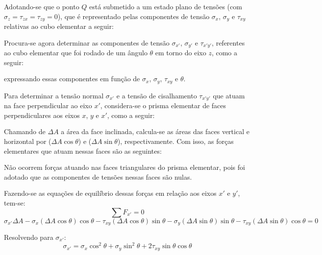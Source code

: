 Adotando-se que o ponto $Q$ está submetido a um estado plano de tensões (com $\sigma_z=\tau_{zx}=\tau_{zy}=0$), que é representado pelas componentes de tensão $\sigma_x$, $\sigma_y$ e $\tau_{xy}$ relativas ao cubo elementar a seguir:

Procura-se agora determinar as componentes de tensão $\sigma_{x'}$, $\sigma_{y'}$ e $\tau_{x'y'}$, referentes ao cubo elementar que foi rodado de um ângulo $\theta$ em torno do eixo $z$, como a seguir:

expressando essas componentes em função de $\sigma_x$, $\sigma_y$, $\tau_{xy}$ e $\theta$.

Para determinar a tensão normal $\sigma_{x'}$ e a tensão de cisalhamento $\tau_{x'y'}$ que atuam na face perpendicular ao eixo $x'$, considera-se o prisma elementar de faces perpendiculares aos eixos $x$, $y$ e $x'$, como a seguir:

Chamando de $\Delta A$ a área da face inclinada, calcula-se as áreas das faces vertical e horizontal por ($\Delta A\cos\theta$) e ($\Delta A\sin\theta$), respectivamente. Com isso, as forças elementares que atuam nessas faces são as seguintes:

Não ocorrem forças atuando nas faces triangulares do prisma elementar, pois foi adotado que as componentes de tensões nessas faces são nulas.

Fazendo-se as equações de equilíbrio dessas forças em relação aos eixos $x'$ e $y'$, tem-se:
$$\sum F_{x'}=0$$
$$\sigma_{x'}\Delta A-\sigma_x(\Delta A\cos\theta)\cos\theta-\tau_{xy}(\Delta A\cos\theta)\sin\theta-\sigma_y(\Delta A\sin\theta)\sin\theta-\tau_{xy}(\Delta A\sin\theta)\cos\theta=0$$

Resolvendo para $\sigma_{x'}$:
$$\sigma_{x'}=\sigma_x\cos^2\theta+\sigma_y\sin^2\theta+2\tau_{xy}\sin\theta\cos\theta$$